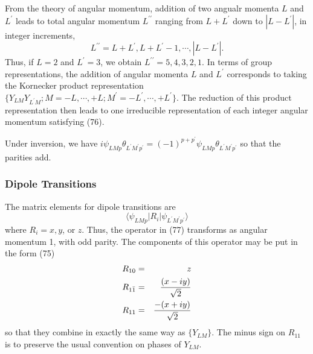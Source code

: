 From the theory of angular momentum, addition of two angualr momenta 
$L$ and $L^{\prime}$ leads to total angular momentum $L^{\prime 
\prime}$ ranging from $L + L^{\prime}$ down to $| L - L^{\prime} |$, 
in integer increments,
\begin{equation}
L^{\prime \prime} = L + L^{\prime} , L + L^{\prime} - 1 , \cdots , | 
L - L^{\prime} |.
\label{chap16-eqno76}
\end{equation}
Thus, if $L = 2$ and $L^{\prime} = 3$, we obtain $L^{\prime \prime} = 
5, 4, 3, 2, 1$.  In terms of group representations, the addition of 
angular momenta $L$ and $L^{\prime}$ corresponds to taking the 
Kornecker product representation $\{ Y_{LM} Y_{L^{\prime}M} ; M = - 
L , \cdots , +L; M^{\prime} = - L^{\prime} , \cdots , + L^{\prime} 
\}$.  The reduction of this product representation then leads to one 
irreducible representation of each integer angular momentum 
satisfying (76).

Under inversion, we have
$i \psi_{LMp} \theta_{L^{\prime}M^{\prime}p^{\prime}} = ( - 1 
)^{p+p^{\prime}} \psi_{LMp} \theta_{L^{\prime}M^{\prime}p^{\prime}}
$ so that the parities add.

\subsubsection{Dipole Transitions}

The matrix elements for dipole transitions are
\begin{equation}
\langle \psi_{LMp} | R_i | \psi_{L^{\prime}M^{\prime}p^{\prime}} 
\rangle
\label{chap16-eqno77}
\end{equation}
where $R_i = x , y$, or $z$.  Thus, the operator in (77) transforms 
as angular momentum 1, with odd parity.  The components of this 
operator may be put in the form (75)
\begin{eqnarray}
R_{10} &=& z\cr
R_{1{\bar{1}}} &=& {(x-iy) \over \sqrt{2}}\cr
R_{11} &=& {-(x + iy) \over \sqrt{2}}
\end{eqnarray}
so that they combine in exactly the same way as $\{Y_{LM}\}$. The 
minus sign on $R_{11}$ is to preserve the usual convention on phases 
of $Y_{LM}$.

